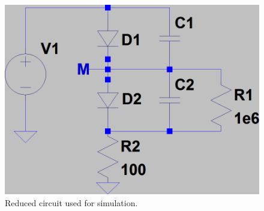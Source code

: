 \documentclass[journal]{IEEEtran}
\begin{document}
\begin{figure}[h!]
  \centering
   \includegraphics[width=\columnwidth]{img/sim_circuit.png}
   \caption{Reduced circuit used for simulation.}
   \label{fig:signal_model}
\end{figure}
\end{document}
